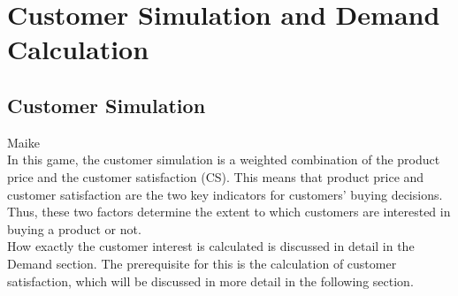 \section{Customer Simulation and Demand Calculation}
\label{sec:customsim}
\subsection{Customer Simulation}
Maike\\
In this game, the customer simulation is a weighted combination of the product price and the customer satisfaction (CS). %
This means that product price and customer satisfaction are the two key indicators for customers' buying decisions. Thus, these two factors determine the extent to which customers are interested in buying a product or not.\\ %

How exactly the customer interest is calculated is discussed in detail in the Demand section. The prerequisite for this is the calculation of customer satisfaction, which will be discussed in more detail in the following section.\\



